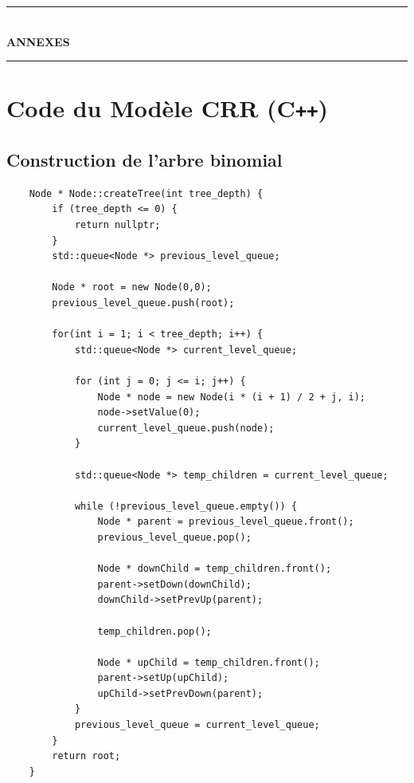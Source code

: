 

\begin{center}
    \rule{\textwidth}{1pt} \\[0.5cm]
    {\Huge \bfseries ANNEXES} \\[0.4cm]
    \rule{\textwidth}{1pt}
\end{center}


\section*{Code du Modèle CRR (C\texttt{++})}

\subsection*{Construction de l'arbre binomial}
\begin{lstlisting}
    Node * Node::createTree(int tree_depth) {
        if (tree_depth <= 0) {
            return nullptr;
        }
        std::queue<Node *> previous_level_queue;
    
        Node * root = new Node(0,0);
        previous_level_queue.push(root);
    
        for(int i = 1; i < tree_depth; i++) {
            std::queue<Node *> current_level_queue;
    
            for (int j = 0; j <= i; j++) {
                Node * node = new Node(i * (i + 1) / 2 + j, i);
                node->setValue(0);
                current_level_queue.push(node);
            }
    
            std::queue<Node *> temp_children = current_level_queue;
    
            while (!previous_level_queue.empty()) {
                Node * parent = previous_level_queue.front();
                previous_level_queue.pop();
    
                Node * downChild = temp_children.front();
                parent->setDown(downChild);
                downChild->setPrevUp(parent);
    
                temp_children.pop();
    
                Node * upChild = temp_children.front();
                parent->setUp(upChild);
                upChild->setPrevDown(parent);
            }
            previous_level_queue = current_level_queue;
        }
        return root;
    }
\end{lstlisting}


